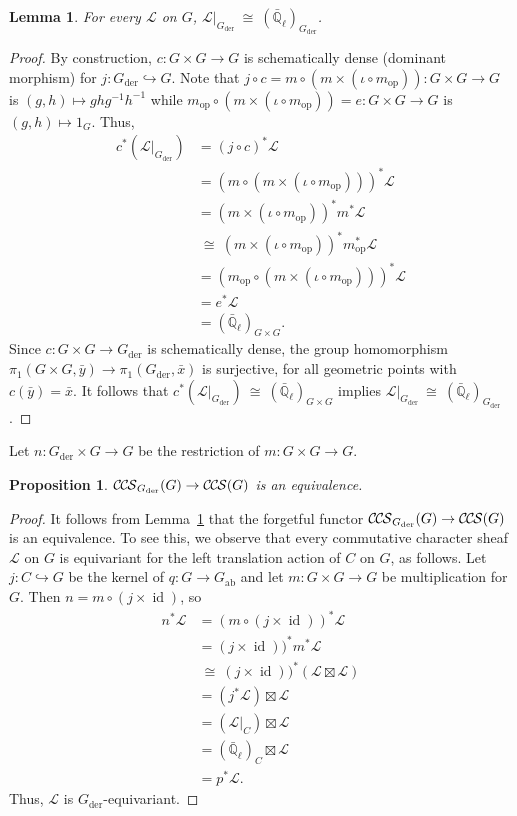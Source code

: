 \documentclass[10pt]{amsart}
\theoremstyle{plain}
\newtheorem{proposition}[theorem]{Proposition}
\newtheorem{lemma}[theorem]{Lemma}
\theoremstyle{definition}
\newcommand{\EE}{\mathbb{\bar Q}_\ell}
\DeclareMathOperator{\id}{id}
\newcommand{\op}{_{\operatorname{op}}}
\newcommand{\der}{_{\operatorname{der}}}
\newcommand{\ab}{_{\operatorname{ab}}}
\newcommand{\iso}{{\ \cong\ }}
\newcommand{\cs}[1]{{\mathcal{#1}}}
\newcommand{\CCS}{{\mathcal{C\hskip-.8pt C\hskip-0.8pt S}}}
\begin{document}
\begin{lemma}\label{lem:Lder}
For every $\cs{L}$ on $G$, $\cs{L}\vert_{G\der} \iso (\EE)_{G\der}$.
\end{lemma}

\begin{proof}
By construction, $c : G \times G \to G$ is schematically dense (dominant morphism) for $j : G\der \hookrightarrow G$. 
Note that $j\circ c = m\circ (m \times (\iota\circ m\op)) : G \times G \to G$ is $(g,h) \mapsto gh g^{-1}h^{-1}$ while $m\op\circ (m \times (\iota\circ m\op))= e : G \times G \to G$ is $(g,h) \mapsto 1_G$. Thus,
\begin{align*}
c^* (\cs{L}\vert_{G\der})
&=  (j\circ c)^*\cs{L} \\
&= (m\circ (m \times (\iota\circ m\op)))^* \cs{L} \\
&= (m \times (\iota\circ m\op))^* m^* \cs{L} \\
&\iso (m \times (\iota\circ m\op))^* m\op^* \cs{L} \\
&= (m\op\circ (m \times (\iota\circ m\op)))^* \cs{L} \\
&= e^* \cs{L}\\
&= (\EE)_{G\times G}.
\end{align*}
Since $c : G \times G \to G\der$ is schematically dense, the group homomorphism $\pi_1(G\times G, {\bar y}) \to \pi_1(G\der, {\bar x})$ is surjective, for all geometric points with $c({\bar y}) = {\bar x}$. It follows that $c^* (\cs{L}\vert_{G\der}) \iso (\EE)_{G\times G}$ implies $\cs{L}\vert_{G\der} \iso (\EE)_{G\der}$. 
\end{proof}

Let $n : G\der \times G \to G$ be the restriction of $m: G\times G \to G$.


\begin{proposition}\label{prop:Gder-equivariance}
$\CCS_{G\der}(G) \to \CCS(G)$ is an equivalence.
\end{proposition}

\begin{proof}
It follows from Lemma~\ref{lem:Lder} that the forgetful functor $\CCS_{G\der}(G) \to \CCS(G)$ is an equivalence. To see this, we observe that
every commutative character sheaf $\cs{L}$ on $G$ is equivariant for the left translation action of $C$ on $G$, as follows.
Let $j : C \hookrightarrow G$ be the kernel of $q : G \to G\ab$ and let $m : G\times G \to G$ be multiplication for $G$. 
Then $n = m \circ (j \times \id)$, so
\begin{align*}
n^* \cs{L} 
&= (m \circ (j \times \id))^* \cs{L}\\
&= (j \times \id))^* m^*\cs{L}\\
&\iso (j \times \id))^* (\cs{L} \boxtimes \cs{L})\\
&= (j^*\cs{L}) \boxtimes \cs{L}\\
&= (\cs{L}\vert_C) \boxtimes \cs{L}\\
&= (\EE)_C \boxtimes \cs{L}\\
&= p^* \cs{L}.
\end{align*}
Thus, $\cs{L}$ is $G\der$-equivariant.
\end{proof}
\end{document}
